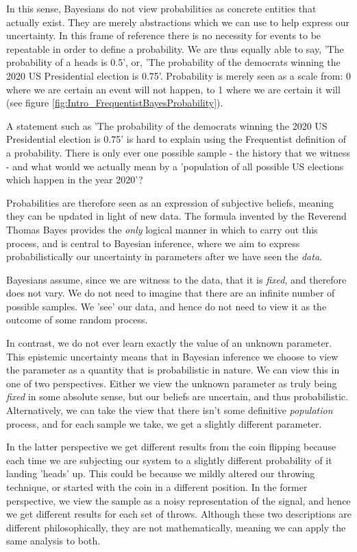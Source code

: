 \documentclass[11pt,fullpage]{book}
\begin{document}
In this sense, Bayesians do not view probabilities as concrete entities that actually exist. They are merely abstractions which we can use to help express our uncertainty. In this frame of reference there is no necessity for events to be repeatable in order to define a probability. We are thus equally able to say, 'The probability of a heads is 0.5', or, 'The probability of the democrats winning the 2020 US Presidential election is 0.75'. Probability is merely seen as a scale from: 0 where we are certain an event will not happen, to 1 where we are certain it will (see figure \ref{fig:Intro_FrequentistBayesProbability}). 

A statement such as 'The probability of the democrats winning the 2020 US Presidential election is 0.75' is hard to explain using the Frequentist definition of a probability. There is only ever one possible sample - the history that we witness - and what would we actually mean by a 'population of all possible US elections which happen in the year 2020'? 

Probabilities are therefore seen as an expression of subjective beliefs, meaning they can be updated in light of new data. The formula invented by the Reverend Thomas Bayes provides the \textit{only} logical manner in which to carry out this process, and is central to Bayesian inference, where we aim to express probabilistically our uncertainty in parameters after we have seen the \textit{data}. 

Bayesians assume, since we are witness to the data, that it is \textit{fixed}, and therefore does not vary. We do not need to imagine that there are an infinite number of possible samples. We 'see' our data, and hence do not need to view it as the outcome of some random process.

In contrast, we do not ever learn exactly the value of an unknown parameter. This epistemic uncertainty means that in Bayesian inference we choose to view the parameter as a quantity that is probabilistic in nature. We can view this in one of two perspectives. Either we view the unknown parameter as truly being \textit{fixed} in some absolute sense, but our beliefs are uncertain, and thus probabilistic. Alternatively, we can take the view that there isn't some definitive \textit{population} process, and for each sample we take, we get a slightly different parameter.

In the latter perspective we get different results from the coin flipping because each time we are subjecting our system to a slightly different probability of it landing 'heads' up. This could be because we mildly altered our throwing technique, or started with the coin in a different position. In the former perspective, we view the sample as a noisy representation of the signal, and hence we get different results for each set of throws. Although these two descriptions are different philosophically, they are not mathematically, meaning we can apply the same analysis to both.
\end{document}
